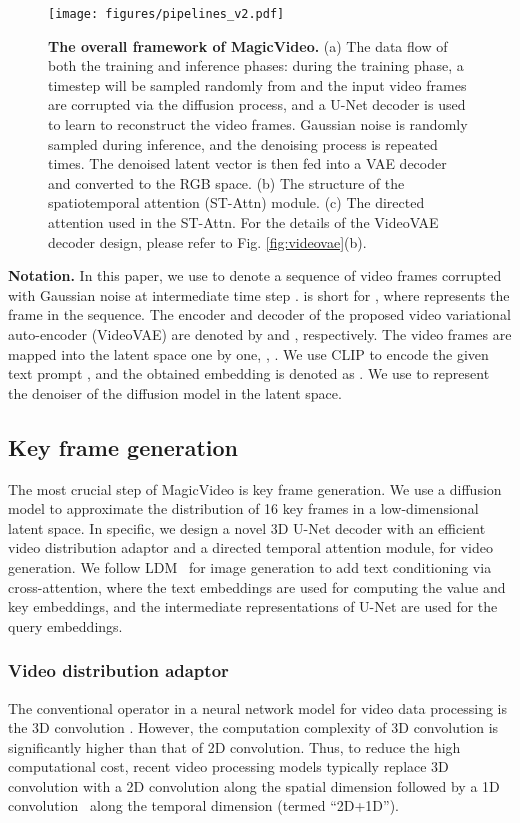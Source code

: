 \documentclass[10pt,twocolumn,letterpaper]{article}
\newcommand{\myPara}[1]{\vspace{6pt}\noindent\textbf{#1}}
\begin{document}
\begin{figure*}[t] 
\centering
\texttt{[image: figures/pipelines\_v2.pdf]}
\caption{\textbf{The overall framework of MagicVideo.} (a) The data flow of both the training and inference phases: during the training phase, a timestep  will be sampled randomly from  and the input video frames are corrupted via the diffusion process, and a U-Net decoder is used to learn to reconstruct the video frames. Gaussian noise is randomly sampled during inference, and the denoising process is repeated  times. The denoised latent vector  is then fed into a VAE decoder and converted to the RGB space. (b) The structure of the spatiotemporal attention (ST-Attn) module. (c) The directed attention used in the ST-Attn. For the details of the VideoVAE decoder design, please refer to Fig. \ref{fig:videovae}(b).}
\vspace{-3mm}
\label{fig:pipeline}
\end{figure*}



\myPara{Notation.} In this paper, we use  to denote a sequence of video frames corrupted with Gaussian noise at intermediate time step .  is short for , where  represents the  frame in the sequence. The encoder and decoder of the proposed video variational auto-encoder (VideoVAE) are denoted by  and , respectively. The video frames are mapped into the latent space one by one, \ie, .
We use CLIP \cite{radford2021learning} to encode the given text prompt , and the obtained embedding is denoted as . We use  to represent the denoiser of the diffusion model in the latent space.



\subsection{Key frame generation}
The most crucial step of MagicVideo is key frame generation. We use a diffusion model to approximate the distribution of {16} key frames in a low-dimensional latent space. 
In specific, we design a novel 3D U-Net decoder with an efficient video distribution adaptor and a directed temporal attention module, for video generation. We follow   LDM~\cite{rombach_high-resolution_2022} for  image generation to add text conditioning via cross-attention, where the text embeddings are used for computing the value and key embeddings, and the intermediate representations of U-Net are used for the query embeddings.


\subsubsection{Video distribution adaptor}
\label{subsubsec:adaptor}
The conventional operator in a neural network model for video data processing is the 3D convolution \cite{carreira2017quo}. However, the computation complexity   of 3D convolution is significantly higher than that of 2D convolution. Thus, to reduce the high computational cost, recent video processing models typically replace 3D convolution with a 2D convolution along the spatial dimension followed by a 1D convolution~\cite{tran2018closer} along the temporal dimension (termed ``2D+1D'').  
\end{document}
